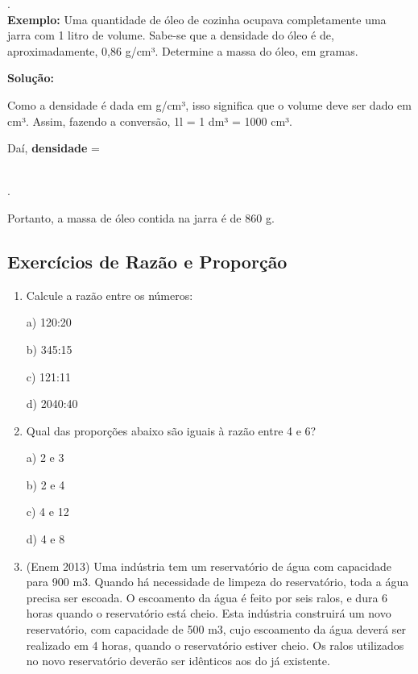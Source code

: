 \begin{multicols*}{2}
\begin{enumerate}
.\\

\textbf{Exemplo:} Uma quantidade de óleo de cozinha ocupava completamente uma jarra com 1 litro de volume. Sabe-se que a densidade do óleo é de, aproximadamente, 0,86 g/cm³.  Determine a massa do óleo, em gramas.

\textbf{Solução:}

Como a densidade é dada em g/cm³, isso significa que o volume deve ser dado em cm³. Assim, fazendo a conversão, 1l = 1 dm³ = 1000 cm³.

Daí, \textbf{densidade} =

\\

.

Portanto, a massa de óleo contida na jarra é de 860 g.
			
			\end{enumerate}
			
\subsection{Exercícios de Razão e Proporção}
			
			\begin{enumerate}
			
			\item Calcule a razão entre os números:

a) 120:20

b) 345:15

c) 121:11

d) 2040:40\\
			
			\item Qual das proporções abaixo são iguais à razão entre 4 e 6?

a) 2 e 3

b) 2 e 4

c) 4 e 12

d) 4 e 8\\
			
			\item (Enem 2013) Uma indústria tem um reservatório de água com capacidade para 900 m3. Quando há necessidade de limpeza do reservatório, toda a água precisa ser escoada. O escoamento da água é feito por seis ralos, e dura 6 horas quando o reservatório está cheio. Esta indústria construirá um novo reservatório, com capacidade de 500 m3, cujo escoamento da água deverá ser realizado em 4 horas, quando o reservatório estiver cheio. Os ralos utilizados no
novo reservatório deverão ser idênticos aos do já existente. 


\end{enumerate}
\end{multicols*}
